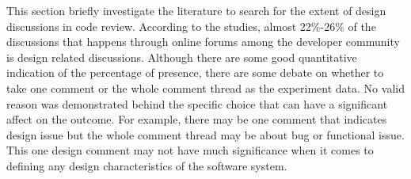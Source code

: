 This section briefly investigate the literature to search for the extent of design discussions in code review. According to the studies, almost 22\%-26\% of the discussions that happens through online forums among the developer community is design related discussions. Although there are some good quantitative indication of the percentage of presence, there are some debate on whether to take one comment or the whole comment thread as the experiment data. No valid reason was demonstrated behind the specific choice that can have a significant affect on the outcome. For example, there may be one comment that indicates design issue but the whole comment thread may be about bug or functional issue. This one design comment may not have much significance when it comes to defining any design characteristics of the software system.    

